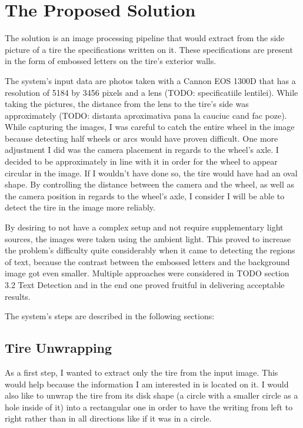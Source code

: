 \chapter{The Proposed Solution}\pagestyle{fancy}\setlength{\parindent}{3em}
\label{chap:proposed-solution}

The solution is an image processing pipeline that would extract from the side picture of a tire the specifications written on it. These specifications are present in the form of embossed letters on the tire's exterior walls.

The system's input data are photos taken with a Cannon EOS 1300D that has a resolution of 5184 by 3456 pixels and a lens (TODO: specificatiile lentilei). While taking the pictures, the distance from the lens to the tire's side was approximately (TODO: distanta aproximativa pana la cauciuc cand fac poze). While capturing the images, I was careful to catch the entire wheel in the image because detecting half wheels or arcs would have proven difficult. One more adjustment I did was the camera placement in regards to the wheel's axle. I decided to be approximately in line with it in order for the wheel to appear circular in the image. If I wouldn't have done so, the tire would have had an oval shape. By controlling the distance between the camera and the wheel, as  well as the camera position in regards to the wheel's axle, I consider I will be able to detect the tire in the image more reliably.

By desiring to not have a complex setup and not require supplementary light sources, the images were taken using the ambient light. This proved to increase the problem's difficulty quite considerably when it came to detecting the regions of text, because the contrast between the embossed letters and the background image got even smaller. Multiple approaches were considered in TODO section 3.2 Text Detection and in the end one proved fruitful in delivering acceptable results.

The system's steps are described in the following sections:

\section{Tire Unwrapping}\label{sec:tire-unwrapping}

As a first step, I wanted to extract only the tire from the input image. This would help because the information I am interested in is located on it. I would also like to unwrap the tire from its disk shape (a circle with a smaller circle as a hole inside of it) into a rectangular one in order to have the writing from left to right rather than in all directions like if it was in a circle.

